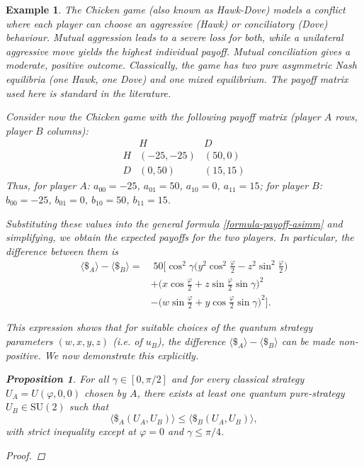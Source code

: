 \documentclass[11pt,a4paper,twoside]{article}
\newcommand{\SU}{\mathrm{SU}}
\newtheorem{proposition}[definition]{Proposition}
\newtheorem{example}{Example}
\begin{document}
\begin{example}\rm
The Chicken game (also known as Hawk-Dove) models a conflict where each player can choose an aggressive (Hawk) or conciliatory (Dove) behaviour. Mutual aggression leads to a severe loss for both, while a unilateral aggressive move yields the highest individual payoff. Mutual conciliation gives a moderate, positive outcome. Classically, the game has two pure asymmetric Nash equilibria (one Hawk, one Dove) and one mixed equilibrium. The payoff matrix used here is standard in the literature.

Consider now the Chicken game with the following payoff matrix (player $A$ rows, player $B$ columns):
\[
\begin{array}{c|cc}
 & H & D \\
\hline
H & (-25,-25) & (50,0) \\
D & (0,50) & (15,15)
\end{array}
\]
Thus, for player $A$: $a_{00}=-25$, $a_{01}=50$, $a_{10}=0$, $a_{11}=15$;
for player $B$: $b_{00}=-25$, $b_{01}=0$, $b_{10}=50$, $b_{11}=15$.


Substituting these values into the general formula \eqref{formula-payoff-asimm} and simplifying, we obtain the expected payoffs for the two players. In particular, the difference between them is
\[
\begin{aligned}
\langle \$ _A \rangle - \langle \$ _B \rangle =&\; 50\big[\cos^2\!\gamma\big(y^2\cos^2\frac{\varphi}{2} - z^2\sin^2\frac{\varphi}{2}\big) \\
&+ \bigl(x\cos\tfrac{\varphi}{2} + z\sin\tfrac{\varphi}{2}\sin\gamma\bigr)^2 \\
&- \bigl(w\sin\tfrac{\varphi}{2}+y \cos\tfrac{\varphi}{2}\sin\gamma\bigr)^2].
\end{aligned}
\]


This expression shows that for suitable choices of the quantum strategy parameters $(w,x,y,z)$ (i.e. of $u_B$), the difference $\langle \$ _A \rangle - \langle \$ _B \rangle$ can be made non-positive. We now demonstrate this explicitly.

\begin{proposition}
For all $\gamma\in[0,\pi/2]$ and for every classical strategy $U_A=U(\varphi,0,0)$ chosen by $A$, there exists at least one quantum pure-strategy $U_B\in\SU(2)$ such that
\[
\langle \$ _A(U_A,U_B)\rangle \le \langle \$ _B(U_A,U_B)\rangle,
\]
with strict inequality except at $\varphi=0$ and $\gamma\leq\pi/4$.
\end{proposition}
\begin{proof}


\end{proof}
\end{example}
\end{document}
